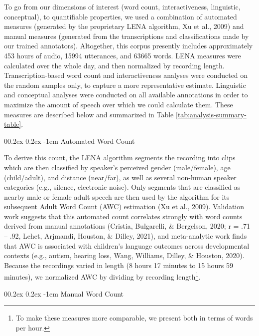\documentclass[
  man,floatsintext]{apa6}
\makeatletter
\let\oldparagraph\paragraph
\renewcommand{\paragraph}[1]{\oldparagraph{#1}\mbox{}}
\renewcommand{\paragraph}{\@startsection{paragraph}{4}{\parindent}%
  {0\baselineskip \@plus 0.2ex \@minus 0.2ex}%
  {-1em}%
  {\normalfont\normalsize\bfseries\itshape\typesectitle}}
\makeatother
\begin{document}
To go from our dimensions of interest (word count, interactiveness, linguistic, conceptual), to quantifiable properties, we used a combination of automated measures (generated by the proprietary LENA algorithm, Xu et al., 2009) and manual measures (generated from the transcriptions and classifications made by our trained annotators). Altogether, this corpus presently includes approximately 453 hours of audio, 15994 utterances, and 63665 words. LENA measures were calculated over the whole day, and then normalized by recording length. Transcription-based word count and interactiveness analyses were conducted on the random samples only, to capture a more representative estimate. Linguistic and conceptual analyses were conducted on all available annotations in order to maximize the amount of speech over which we could calculate them. These measures are described below and summarized in Table \ref{tab:analysis-summary-table}.

\hypertarget{automated-word-count}{%
\paragraph{Automated Word Count}\label{automated-word-count}}

To derive this count, the LENA algorithm segments the recording into clips which are then classified by speaker's perceived gender (male/female), age (child/adult), and distance (near/far), as well as several non-human speaker categories (e.g., silence, electronic noise). Only segments that are classified as nearby male or female adult speech are then used by the algorithm for its subsequent Adult Word Count (AWC) estimation (Xu et al., 2009). Validation work suggests that this automated count correlates strongly with word counts derived from manual annotations (Cristia, Bulgarelli, \& Bergelson, 2020; r = .71 -- .92, Lehet, Arjmandi, Houston, \& Dilley, 2021), and meta-analytic work finds that AWC is associated with children's language outcomes across developmental contexts (e.g., autism, hearing loss, Wang, Williams, Dilley, \& Houston, 2020). Because the recordings varied in length (8 hours 17 minutes to 15 hours 59 minutes), we normalized AWC by dividing by recording length\footnote{To make these measures more comparable, we present both in terms of words per hour.}.

\hypertarget{manual-word-count}{%
\paragraph{Manual Word Count}\label{manual-word-count}}
\end{document}
